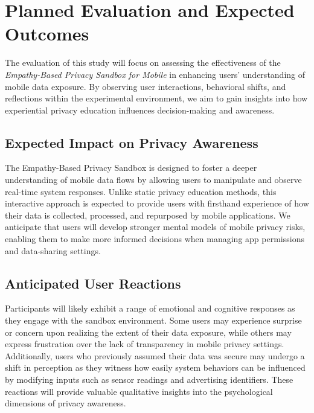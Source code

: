 \documentclass[acmlarge, nonacm]{acmart}
\begin{document}


\section{Planned Evaluation and Expected Outcomes}
The evaluation of this study will focus on assessing the effectiveness of the \textit{Empathy-Based Privacy Sandbox for Mobile} in enhancing users' understanding of mobile data exposure. By observing user interactions, behavioral shifts, and reflections within the experimental environment, we aim to gain insights into how experiential privacy education influences decision-making and awareness.

\subsection{Expected Impact on Privacy Awareness}

The Empathy-Based Privacy Sandbox is designed to foster a deeper understanding of mobile data flows by allowing users to manipulate and observe real-time system responses. Unlike static privacy education methods, this interactive approach is expected to provide users with firsthand experience of how their data is collected, processed, and repurposed by mobile applications. We anticipate that users will develop stronger mental models of mobile privacy risks, enabling them to make more informed decisions when managing app permissions and data-sharing settings.

\subsection{Anticipated User Reactions}
Participants will likely exhibit a range of emotional and cognitive responses as they engage with the sandbox environment. Some users may experience surprise or concern upon realizing the extent of their data exposure, while others may express frustration over the lack of transparency in mobile privacy settings. Additionally, users who previously assumed their data was secure may undergo a shift in perception as they witness how easily system behaviors can be influenced by modifying inputs such as sensor readings and advertising identifiers. These reactions will provide valuable qualitative insights into the psychological dimensions of privacy awareness.
\end{document}
